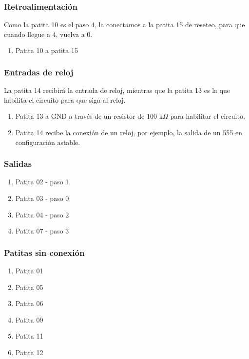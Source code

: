 \documentclass[../principal.tex]{subfiles}
\begin{document}
\subsubsection{Retroalimentación}

Como la patita 10 es el paso 4, la conectamos a la patita 15 de reseteo, para que cuando llegue a 4, vuelva a 0.

\begin{enumerate}
    \item Patita 10 a patita 15
\end{enumerate}

\subsubsection{Entradas de reloj}

La patita 14 recibirá la entrada de reloj, mientras que la patita 13 es la que habilita el circuito para que siga al reloj.

\begin{enumerate}
    \item Patita 13 a GND a través de un resistor de 100 k$\Omega$ para habilitar el circuito.
    \item Patita 14 recibe la conexión de un reloj, por ejemplo, la salida de un 555 en configuración astable.
\end{enumerate}

\subsubsection{Salidas}

\begin{enumerate}
    \item Patita 02 - paso 1
    \item Patita 03 - paso 0
    \item Patita 04 - paso 2
    \item Patita 07 - paso 3

\end{enumerate}

\subsubsection{Patitas sin conexión}

\begin{enumerate}
    \item Patita 01
    \item Patita 05
    \item Patita 06
    \item Patita 09
    \item Patita 11
    \item Patita 12
\end{enumerate}


\newpage
\end{document}
